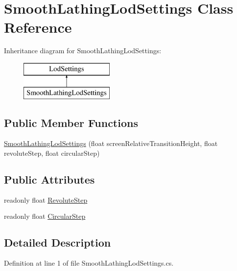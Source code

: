 \hypertarget{class_smooth_lathing_lod_settings}{}\section{Smooth\+Lathing\+Lod\+Settings Class Reference}
\label{class_smooth_lathing_lod_settings}
Inheritance diagram for Smooth\+Lathing\+Lod\+Settings\+:\begin{figure}[H]
\begin{center}
\leavevmode
\includegraphics[height=2.000000cm]{class_smooth_lathing_lod_settings}
\end{center}
\end{figure}
\subsection*{Public Member Functions}
\begin{DoxyCompactItemize}
\item 
\mbox{\hyperlink{class_smooth_lathing_lod_settings_a3fc49355e780895ff32251fd69bd809f}{Smooth\+Lathing\+Lod\+Settings}} (float screen\+Relative\+Transition\+Height, float revolute\+Step, float circular\+Step)
\end{DoxyCompactItemize}
\subsection*{Public Attributes}
\begin{DoxyCompactItemize}
\item 
readonly float \mbox{\hyperlink{class_smooth_lathing_lod_settings_a53a6e0dff50e8ede70039050bc5b274c}{Revolute\+Step}}
\item 
readonly float \mbox{\hyperlink{class_smooth_lathing_lod_settings_a35ee4b8040b8daccd52d974a37752b06}{Circular\+Step}}
\end{DoxyCompactItemize}


\subsection{Detailed Description}


Definition at line 1 of file Smooth\+Lathing\+Lod\+Settings.\+cs.



